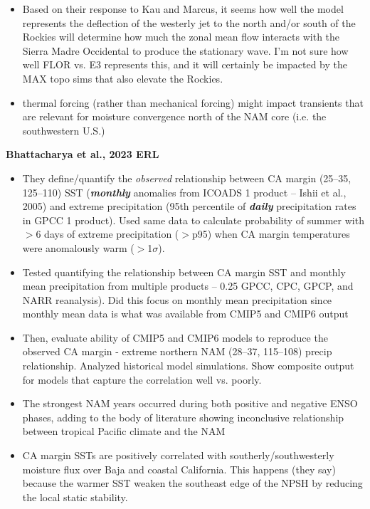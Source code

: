\documentclass[11pt]{article}
\begin{document}
\begin{itemize}
    \item Based on their response to Kau and Marcus, it seems how well the model represents the deflection of the westerly jet to the north and/or south of the Rockies will determine how much the zonal mean flow interacts with the Sierra Madre Occidental to produce the stationary wave. I'm not sure how well FLOR vs. E3 represents this, and it will certainly be impacted by the MAX topo sims that also elevate the Rockies. 
    \item thermal forcing (rather than mechanical forcing) might impact transients that are relevant for moisture convergence north of the NAM core (i.e. the southwestern U.S.)
\end{itemize}
\newpage

\textbf{Bhattacharya et al., 2023 ERL}
\begin{itemize}
    \item They define/quantify the \textit{observed} relationship between CA margin (25--35, 125--110) SST (\textbf{\textit{monthly}} anomalies from ICOADS 1\textdegree{} product -- Ishii et al., 2005) and extreme precipitation (95th percentile of \textbf{\textit{daily}} precipitation rates in GPCC 1\textdegree{} product). Used same data to calculate probability of summer with $>$6 days of extreme precipitation ($>$p95) when CA margin temperatures were anomalously warm ($>$1$\sigma$).
    \item Tested quantifying the relationship between CA margin SST and monthly mean precipitation from multiple products -- 0.25\textdegree{} GPCC, CPC, GPCP, and NARR reanalysis). Did this focus on monthly mean precipitation since monthly mean data is what was available from CMIP5 and CMIP6 output
    \item Then, evaluate ability of CMIP5 and CMIP6 models to reproduce the observed CA margin - extreme northern NAM (28--37, 115--108) precip relationship. Analyzed historical model simulations. Show composite output for models that capture the correlation well vs. poorly.
    \item The strongest NAM years occurred during both positive and negative ENSO phases, adding to the body of literature showing inconclusive relationship between tropical Pacific climate and the NAM
    \item CA margin SSTs are positively correlated with southerly/southwesterly moisture flux over Baja and coastal California. This happens (they say) because the warmer SST weaken the southeast edge of the NPSH by reducing the local static stability.

\end{itemize}
\end{document}
